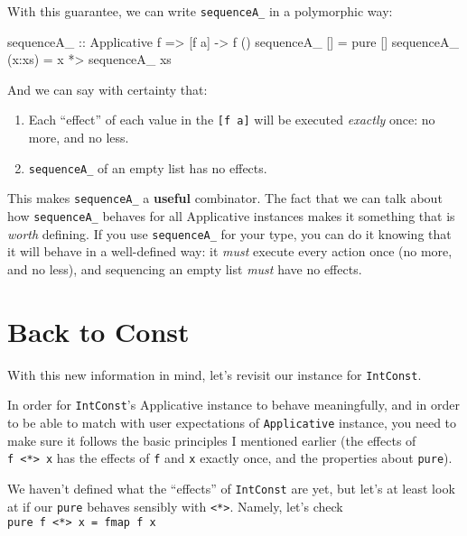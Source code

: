 \documentclass[]{article}
\newenvironment{Shaded}{}{}
\newcommand{\DataTypeTok}[1]{\textcolor[rgb]{0.56,0.13,0.00}{#1}}
\newcommand{\FunctionTok}[1]{\textcolor[rgb]{0.02,0.16,0.49}{#1}}
\newcommand{\NormalTok}[1]{#1}
\newcommand{\OtherTok}[1]{\textcolor[rgb]{0.00,0.44,0.13}{#1}}
\begin{document}
With this guarantee, we can write \texttt{sequenceA\_} in a polymorphic way:

\begin{Shaded}
\begin{Highlighting}[]
\OtherTok{sequenceA_ ::} \DataTypeTok{Applicative}\NormalTok{ f }\OtherTok{=>}\NormalTok{ [f a] }\OtherTok{->}\NormalTok{ f ()}
\NormalTok{sequenceA_ []     }\FunctionTok{=}\NormalTok{ pure []}
\NormalTok{sequenceA_ (x}\FunctionTok{:}\NormalTok{xs) }\FunctionTok{=}\NormalTok{ x }\FunctionTok{*>}\NormalTok{ sequenceA_ xs}
\end{Highlighting}
\end{Shaded}

And we can say with certainty that:

\begin{enumerate}
\def\labelenumi{\arabic{enumi}.}
\tightlist
\item
  Each ``effect'' of each value in the \texttt{{[}f\ a{]}} will be executed
  \emph{exactly} once: no more, and no less.
\item
  \texttt{sequenceA\_} of an empty list has no effects.
\end{enumerate}

This makes \texttt{sequenceA\_} a \textbf{useful} combinator. The fact that we
can talk about how \texttt{sequenceA\_} behaves for all Applicative instances
makes it something that is \emph{worth} defining. If you use
\texttt{sequenceA\_} for your type, you can do it knowing that it will behave in
a well-defined way: it \emph{must} execute every action once (no more, and no
less), and sequencing an empty list \emph{must} have no effects.

\hypertarget{back-to-const}{%
\section{Back to Const}\label{back-to-const}}

With this new information in mind, let's revisit our instance for
\texttt{IntConst}.

In order for \texttt{IntConst}'s Applicative instance to behave meaningfully,
and in order to be able to match with user expectations of \texttt{Applicative}
instance, you need to make sure it follows the basic principles I mentioned
earlier (the effects of \texttt{f\ \textless{}*\textgreater{}\ x} has the
effects of \texttt{f} and \texttt{x} exactly once, and the properties about
\texttt{pure}).

We haven't defined what the ``effects'' of \texttt{IntConst} are yet, but let's
at least look at if our \texttt{pure} behaves sensibly with
\texttt{\textless{}*\textgreater{}}. Namely, let's check
\texttt{pure\ f\ \textless{}*\textgreater{}\ x\ =\ fmap\ f\ x}
\end{document}

